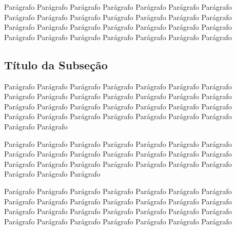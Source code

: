 Parágrafo Parágrafo Parágrafo Parágrafo Parágrafo Parágrafo Parágrafo Parágrafo Parágrafo Parágrafo Parágrafo Parágrafo Parágrafo Parágrafo Parágrafo Parágrafo Parágrafo Parágrafo Parágrafo Parágrafo Parágrafo Parágrafo Parágrafo Parágrafo Parágrafo Parágrafo Parágrafo Parágrafo 

\subsection{Título da Subseção}

Parágrafo Parágrafo Parágrafo Parágrafo Parágrafo Parágrafo Parágrafo Parágrafo Parágrafo Parágrafo Parágrafo Parágrafo Parágrafo Parágrafo Parágrafo Parágrafo Parágrafo Parágrafo Parágrafo Parágrafo Parágrafo Parágrafo Parágrafo Parágrafo Parágrafo Parágrafo Parágrafo Parágrafo Parágrafo Parágrafo 

Parágrafo Parágrafo Parágrafo Parágrafo Parágrafo Parágrafo Parágrafo Parágrafo Parágrafo Parágrafo Parágrafo Parágrafo Parágrafo Parágrafo Parágrafo Parágrafo Parágrafo Parágrafo Parágrafo Parágrafo Parágrafo Parágrafo Parágrafo Parágrafo 

Parágrafo Parágrafo Parágrafo Parágrafo Parágrafo Parágrafo Parágrafo Parágrafo Parágrafo Parágrafo Parágrafo Parágrafo Parágrafo Parágrafo Parágrafo Parágrafo Parágrafo Parágrafo Parágrafo Parágrafo Parágrafo Parágrafo Parágrafo Parágrafo Parágrafo Parágrafo Parágrafo Parágrafo 